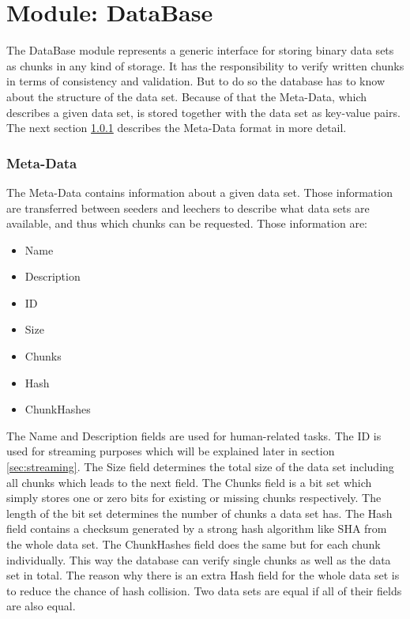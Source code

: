 \cleardoublepage
\section{Module: DataBase}
\label{sec:database}
The DataBase module represents a generic interface for storing binary data sets as chunks in any kind of storage. It has the responsibility to verify written chunks in terms of consistency and validation. But to do so the database has to know about the structure of the data set. Because of that the Meta-Data, which describes a given data set, is stored together with the data set as key-value pairs. The next section \ref{subsubsec:metadata} describes the Meta-Data format in more detail.

\subsubsection{Meta-Data}
\label{subsubsec:metadata}
The Meta-Data contains information about a given data set. Those information are transferred between seeders and leechers to describe what data sets are available, and thus which chunks can be requested. Those information are:
\begin{itemize} 
\setlength{\parskip}{1pt}
\item Name
\item Description
\item ID
\item Size
\item Chunks
\item Hash
\item ChunkHashes
\end{itemize}
The Name and Description fields are used for human-related tasks. The ID is used for streaming purposes which will be explained later in section \ref{sec:streaming}. The Size field determines the total size of the data set including all chunks which leads to the next field. The Chunks field is a bit set which simply stores one or zero bits for existing or missing chunks respectively. The length of the bit set determines the number of chunks a data set has. The Hash field contains a checksum generated by a strong hash algorithm like SHA from the whole data set. The ChunkHashes field does the same but for each chunk individually. This way the database can verify single chunks as well as the data set in total. The reason why there is an extra Hash field for the whole data set is to reduce the chance of hash collision. Two data sets are equal if all of their fields are also equal.

